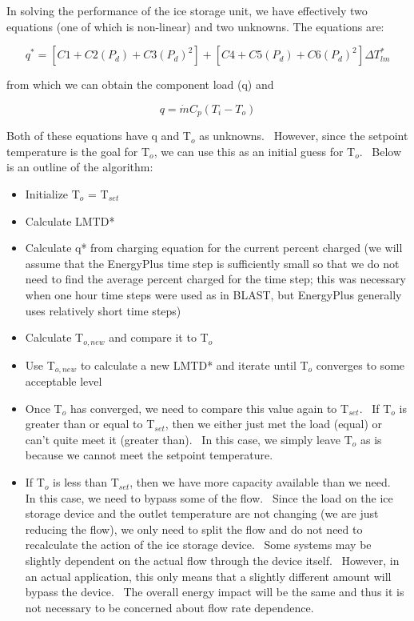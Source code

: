 In solving the performance of the ice storage unit, we have effectively two equations (one of which is non-linear) and two unknowns. The equations are:

\begin{equation}
{q^*} = \left[ {C1 + C2\left( {{P_d}} \right) + C3{{\left( {{P_d}} \right)}^2}} \right] + \left[ {C4 + C5\left( {{P_d}} \right) + C6{{\left( {{P_d}} \right)}^2}} \right]\Delta T_{lm}^*
\end{equation}

from which we can obtain the component load (q) and

\begin{equation}
q = \dot m{C_p}\left( {{T_i} - {T_o}} \right)
\end{equation}

Both of these equations have q and T\(_{o}\) as unknowns.~ However, since the setpoint temperature is the goal for T\(_{o}\), we can use this as an initial guess for T\(_{o}\).~ Below is an outline of the algorithm:

\begin{itemize}
  \item
    Initialize T\(_{o}\) = T\(_{set}\)
  \item
    Calculate LMTD*
  \item
    Calculate q* from charging equation for the current percent charged (we will assume that the EnergyPlus time step is sufficiently small so that we do not need to find the average percent charged for the time step; this was necessary when one hour time steps were used as in BLAST, but EnergyPlus generally uses relatively short time steps)
  \item
    Calculate T\(_{o,new}\) and compare it to T\(_{o}\)
  \item
    Use T\(_{o,new}\) to calculate a new LMTD* and iterate until T\(_{o}\) converges to some acceptable level
  \item
    Once T\(_{o}\) has converged, we need to compare this value again to T\(_{set}\).~ If T\(_{o}\) is greater than or equal to T\(_{set}\), then we either just met the load (equal) or can't quite meet it (greater than).~ In this case, we simply leave T\(_{o}\) as is because we cannot meet the setpoint temperature.
  \item
    If T\(_{o}\) is less than T\(_{set}\), then we have more capacity available than we need.~ In this case, we need to bypass some of the flow.~ Since the load on the ice storage device and the outlet temperature are not changing (we are just reducing the flow), we only need to split the flow and do not need to recalculate the action of the ice storage device.~ Some systems may be slightly dependent on the actual flow through the device itself.~ However, in an actual application, this only means that a slightly different amount will bypass the device.~ The overall energy impact will be the same and thus it is not necessary to be concerned about flow rate dependence.
\end{itemize}

